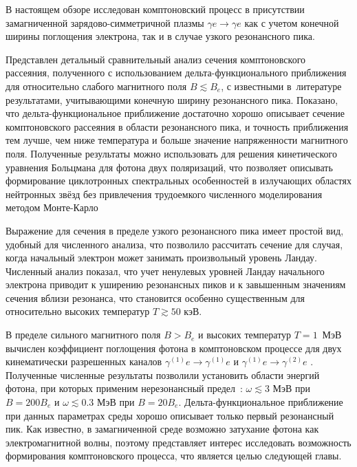 В настоящем обзоре исследован комптоновский процесс в присутствии замагниченной зарядово-симметричной плазмы $\gamma e \to \gamma e$ как с учетом конечной ширины поглощения электрона, так и в случае узкого резонансного пика. 

Представлен детальный сравнительный анализ сечения комптоновского рассеяния, полученного с использованием дельта-функционального приближения~\cite{Rumyantsev:2017} для относительно слабого магнитного поля $B\lesssim B_e$, с известными в~литературе~\cite{Harding:1986,Mushtukov:2016,SchwarmD:2017} результатами, учитывающими конечную ширину резонансного пика. Показано, что дельта-функциональное приближение достаточно хорошо описывает сечение комптоновского рассеяния в области резонансного пика, и точность приближения тем лучше, чем ниже температура и больше значение напряженности магнитного поля. 
Полученные результаты можно использовать для решения кинетического уравнения Больцмана для фотона двух поляризаций, что позволяет описывать формирование циклотронных спектральных особенностей в
излучающих областях нейтронных звёзд без привлечения трудоемкого численного моделирования методом Монте-Карло


Выражение для сечения в пределе узкого резонансного пика имеет простой вид, удобный для численного анализа, что позволило рассчитать сечение для случая, когда начальный электрон может занимать произвольный уровень Ландау. Численный анализ показал, что учет ненулевых уровней Ландау начального электрона приводит к уширению резонансных пиков и к завышенным значениям сечения  вблизи резонанса, что становится особенно существенным для относительно высоких температур $T\gtrsim 50$ кэВ.

В пределе сильного магнитного поля $B>B_e$ и высоких температур \mbox{$T=1$ МэВ} вычислен коэффициент поглощения фотона в комптоновском процессе для двух кинематически разрешенных каналов \mbox{$\gamma^{(1)} e\to \gamma^{(1)} e$} и $\gamma^{(1)} e\to \gamma^{(2)} e$ . Полученные численные результаты позволили установить области энергий фотона, при которых применим нерезонансный предел~\cite{Chistyakov:2009}: $\omega\lesssim 3$ МэВ при $B=200B_e$ и $\omega\lesssim 0.3$ МэВ при $B=20B_e$. Дельта-функциональное приближение при данных параметрах среды хорошо описывает только первый резонансный пик.  Как известно, в замагниченной среде возможно затухание фотона как электромагнитной волны, поэтому представляет интерес исследовать возможность формирования комптоновского процесса, что является целью следующей главы.

